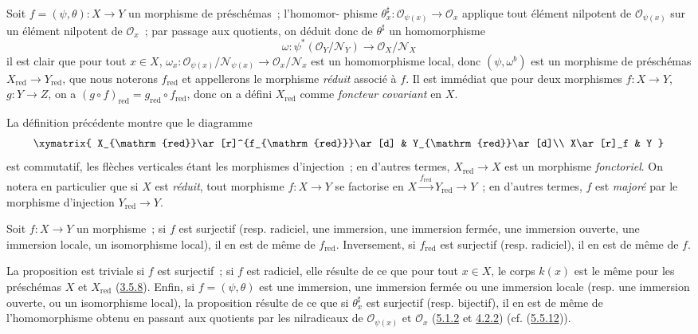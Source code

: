\begin{env}[5.1.5]
\label{I.5.1.5-fr}
Soit $f=(\psi,\theta):X\to Y$ un morphisme de préschémas~; l'homomor-
phisme $\theta_x^\sharp:\mathscr{O}_{\psi(x)}\to\mathscr{O}_x$ applique tout
élément nilpotent de $\mathscr{O}_{\psi(x)}$ sur un élément nilpotent de
$\mathscr{O}_x$~; par passage aux quotients, on déduit donc de $\theta^\sharp$
un homomorphisme
\[
  \omega:\psi^*(\mathscr{O}_Y/\mathscr{N}_Y)
  \longrightarrow \mathscr{O}_X/\mathscr{N}_X
\]
il est clair que pour tout $x\in X$,
$\omega_x:\mathscr{O}_{\psi(x)}/\mathscr{N}_{\psi(x)}
\to\mathscr{O}_x/\mathscr{N}_x$ est un homomorphisme local, donc
$(\psi,\omega^b)$ est un morphisme de préschémas
$X_{\mathrm{red}}\to Y_{\mathrm{red}}$, que nous noterons $f_{\mathrm{red}}$
et appellerons le morphisme \emph{réduit} associé à $f$. Il est immédiat que
pour deux morphismes $f:X\to Y$, $g:Y\to Z$, on a
$(g\circ f)_{\mathrm{red}}=g_{\mathrm{red}}\circ f_{\mathrm{red}}$, donc on a
défini $X_{\mathrm{red}}$ comme \emph{foncteur covariant} en $X$.

La définition précédente montre que le diagramme
\[
  \xymatrix{
    X_{\mathrm{red}}\ar[r]^{f_{\mathrm{red}}}\ar[d] &
    Y_{\mathrm{red}}\ar[d]\\
    X\ar[r]_f & Y
  }
\]
est commutatif, les flèches verticales étant les morphismes d'injection~; en
d'autres termes, $X_{\mathrm{red}}\to X$ est un morphisme \emph{fonctoriel}.
On notera en particulier que si $X$ est \emph{réduit}, tout morphisme
$f:X\to Y$ se factorise en
$X\xrightarrow{f_{\mathrm{red}}}Y_{\mathrm{red}}\to Y$~; en d'autres termes,
$f$ est \emph{majoré} par le morphisme d'injection
$Y_{\mathrm{red}}\to Y$.
\end{env}

\begin{proposition}[5.1.6]
\label{I.5.1.6-fr}
Soit $f:X\to Y$ un morphisme~; si $f$ est surjectif (resp. radiciel, une
immersion, une immersion fermée, une immersion ouverte, une immersion locale,
un isomorphisme local), il en est de même de $f_{\mathrm{red}}$. Inversement,
si $f_{\mathrm{red}}$ est surjectif (resp. radiciel), il en est de même de
$f$.
\end{proposition}

La proposition est triviale si $f$ est surjectif~; si $f$ est radiciel, elle
résulte de ce que pour tout $x\in X$, le corps $k(x)$ est le même pour les
préschémas $X$ et $X_{\mathrm{red}}$
(\hyperref[I.3.5.8-fr]{3.5.8}). Enfin, si $f=(\psi,\theta)$ est une immersion,
une immersion fermée ou une immersion locale (resp. une immersion ouverte, ou
un isomorphisme local), la proposition résulte de ce que si
$\theta_x^\sharp$ est surjectif (resp. bijectif), il en est de même de
l'homomorphisme obtenu en passant aux quotients par les nilradicaux de
$\mathscr{O}_{\psi(x)}$ et $\mathscr{O}_x$
(\hyperref[I.5.1.2-fr]{5.1.2} et \hyperref[I.4.2.2-fr]{4.2.2})
(cf. (\hyperref[I.5.5.12-fr]{5.5.12})).

